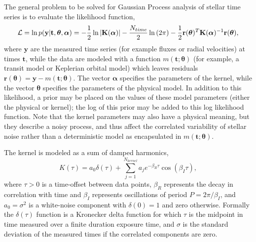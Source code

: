 \documentclass[manuscript, letterpaper]{aastex6}
\makeatletter
\let\origsection\section
\renewcommand\section{\@ifstar{\starsection}{\nostarsection}}
\newcommand\nostarsection[1]{\sectionprelude\origsection{#1}}
\newcommand\starsection[1]{\sectionprelude\origsection*{#1}}
\newcommand\sectionprelude{\vspace{1em}}
\newcommand{\bvec}[1]{{\ensuremath{\boldsymbol{#1}}}}
\makeatother
\begin{document}
\section{Generalized Press-Rybicki}

The general problem to be solved for Gaussian Process analysis of stellar time series is to evaluate
the likelihood function,
\begin{equation}
{\cal{L}} = \ln{p(\mathbf{y}\vert {\mathbf{t},\bvec{\theta}},\bvec{\alpha})} = -\frac{1}{2}\ln{\vert \mathbf{K}(\bvec{\alpha}) \vert}
- \frac{N_{time}}{2} \ln{(2\pi)}
    - \frac{1}{2} {\mathbf r} (\bvec{\theta} ) ^T \mathbf{K}(\bvec{\alpha})^{-1} \mathbf{r}(\bvec{\theta}),
\end{equation}
where $\mathbf{y}$ are the measured time series (for example fluxes or radial velocities) at times
$\mathbf{t}$, while the data are modeled with a function $m(\mathbf{t};\bvec{\theta})$ (for example,
a transit model or Keplerian orbital model) which leaves residuals $\mathbf{r}(\bvec{\theta}) =
\mathbf{y} - m(\mathbf{t};\bvec{\theta})$. %
The vector $\bvec{\alpha}$ specifies the parameters of the kernel, while the vector $\bvec{\theta}$
specifies the parameters of the physical model.  In addition to this likelihood, a prior may be placed on
the values of these model parameters (either the physical or kernel); the log of this prior may be
added to this log likelihood function.  Note that the kernel
parameters may also have a physical meaning, but they describe a noisy process, and thus affect
the correlated variability of stellar noise rather than a deterministic model as encapsulated in
$m(\mathbf{t};\bvec{\theta})$.

The kernel is modeled as a sum of damped harmonics,
\begin{equation}
K(\tau) = a_0 \delta(\tau) + \sum_{j=1}^{N_{kernel}} a_j e^{-\beta_R \tau} \cos{(\beta_I \tau)},
\end{equation}
where $\tau > 0$ is a time-offset between data points, $\beta_R$ represents the decay
in correlation with time and $\beta_I$ represents oscillations of period $P = 2\pi/\beta_I$, and
$a_0 = \sigma^2$ is a white-noise component with $\delta(0) = 1$ and zero otherwise.  Formally
the $\delta(\tau)$ function is a Kronecker delta function for which $\tau$ is the midpoint in
time measured over a finite duration exposure time, and $\sigma$ is the standard deviation
of the measured times if the correlated components are zero.
\end{document}
